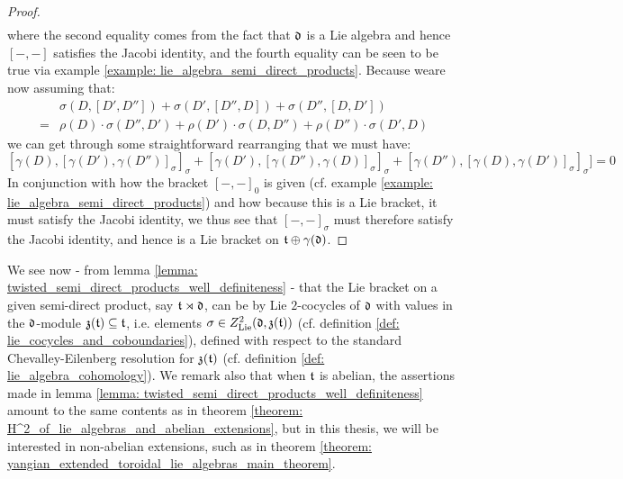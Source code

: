 \begin{proof}
$$\begin{aligned}
                        \end{aligned}
                    $$
                where the second equality comes from the fact that $\mathfrak{d}$ is a Lie algebra and hence $[-, -]$ satisfies the Jacobi identity, and the fourth equality can be seen to be true via example \ref{example: lie_algebra_semi_direct_products}. Because weare now assuming that:
                    $$
                        \begin{aligned}
                            & \sigma( D, [D', D''] ) + \sigma( D', [D'', D] ) + \sigma( D'', [D, D'] )
                            \\
                            = & \rho(D) \cdot \sigma(D'', D') + \rho(D') \cdot \sigma(D, D'') + \rho(D'') \cdot \sigma(D', D)
                        \end{aligned}
                    $$
                we can get through some straightforward rearranging that we must have:
                    $$[ \gamma(D), [\gamma(D'), \gamma(D'')]_{\sigma} ]_{\sigma} + [ \gamma(D'), [\gamma(D''), \gamma(D)]_{\sigma} ]_{\sigma} + [ \gamma(D''), [\gamma(D), \gamma(D')]_{\sigma} ]_{\sigma} ] = 0$$
                In conjunction with how the bracket $[-, -]_0$ is given (cf. example \ref{example: lie_algebra_semi_direct_products}) and how because this is a Lie bracket, it must satisfy the Jacobi identity, we thus see that $[-, -]_{\sigma}$ must therefore satisfy the Jacobi identity, and hence is a Lie bracket on $\mathfrak{t} \oplus \gamma(\mathfrak{d})$.
            \end{proof}
        \begin{remark}
            We see now - from lemma \ref{lemma: twisted_semi_direct_products_well_definiteness} - that the Lie bracket on a given semi-direct product, say $\mathfrak{t} \rtimes \mathfrak{d}$, can be  by Lie $2$-cocycles of $\mathfrak{d}$ with values in the $\mathfrak{d}$-module $\mathfrak{z}(\mathfrak{t}) \subseteq \mathfrak{t}$, i.e. elements $\sigma \in Z^2_{\mathrm{Lie}}(\mathfrak{d}, \mathfrak{z}(\mathfrak{t}))$ (cf. definition \ref{def: lie_cocycles_and_coboundaries}), defined with respect to the standard Chevalley-Eilenberg resolution for $\mathfrak{z}(\mathfrak{t})$ (cf. definition \ref{def: lie_algebra_cohomology}). We remark also that when $\mathfrak{t}$ is abelian, the assertions made in lemma \ref{lemma: twisted_semi_direct_products_well_definiteness} amount to the same contents as in theorem \ref{theorem: H^2_of_lie_algebras_and_abelian_extensions}, but in this thesis, we will be interested in non-abelian extensions, such as in theorem \ref{theorem: yangian_extended_toroidal_lie_algebras_main_theorem}.
        \end{remark}
